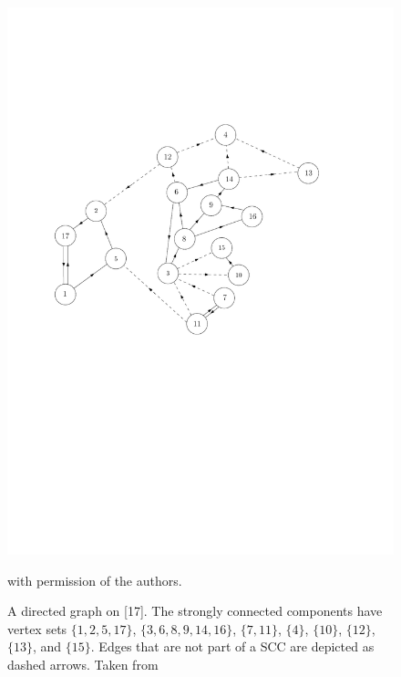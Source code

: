 \begin{figure}
    \centering
    \includegraphics[scale=0.6]{Content/Pictures/biggraph.pdf}
    \caption{A directed graph on [17]. The strongly connected components have vertex sets $\{1,2,5,17\}$, $\{3,6,8,9,14,16\}$, $\{7,11\}$, $\{4\}$, $\{10\}$, $\{12\}$, $\{13\}$, and $\{15\}$. Edges that are not part of a SCC are depicted as dashed arrows. Taken from \cite{goldschmidtScalingLimitCritical2019}} with permission of the authors.
    \label{fig.SCCs}
\end{figure}

